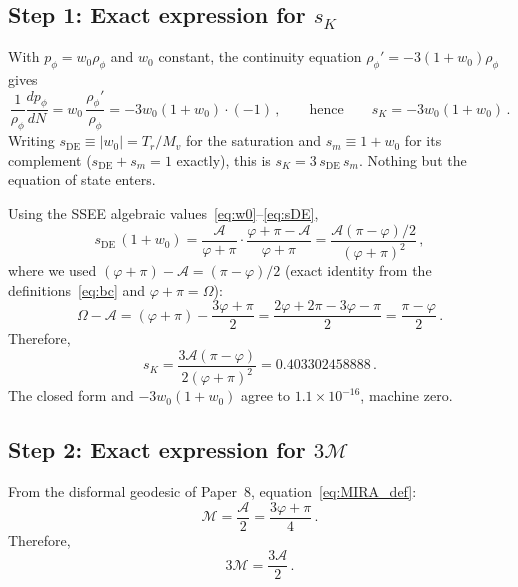 \documentclass[12pt,a4paper]{article}
\newcommand{\phiG}{\varphi}
\newcommand{\MIRA}{\mathcal{M}}
\newcommand{\AURA}{\mathcal{A}}
\newcommand{\sK}{s_K}          %
\newcommand{\sDE}{s_{\mathrm{DE}}} %
\renewcommand{\Omega}{\varOmega}
\begin{document}
\subsection{Step 1: Exact expression for $\sK$}
\label{sec:step1}

With $p_\phi = w_0\rho_\phi$ and $w_0$ constant, the continuity equation
$\rho_\phi' = -3(1+w_0)\rho_\phi$ gives
\begin{equation}
  \frac{1}{\rho_\phi}\frac{dp_\phi}{dN}
    = w_0\,\frac{\rho_\phi'}{\rho_\phi}
    = -3w_0(1+w_0)\cdot(-1)\,,
  \qquad\text{hence}\qquad
  \sK = -3w_0(1+w_0)\,.
  \label{eq:sK_exact}
\end{equation}
Writing $\sDE \equiv |w_0| = T_r/M_v$ for the saturation and
$s_m \equiv 1+w_0$ for its complement ($\sDE + s_m = 1$ exactly), this is
$\sK = 3\,\sDE\,s_m$.  Nothing but the equation of state enters.

Using the SSEE algebraic values~\eqref{eq:w0}--\eqref{eq:sDE},
\begin{equation}
  \sDE\,(1+w_0) = \frac{\AURA}{\phiG+\pi}\cdot\frac{\phiG+\pi-\AURA}{\phiG+\pi}
  = \frac{\AURA(\pi-\phiG)/2}{(\phiG+\pi)^2}\,,
  \label{eq:OmDE_1pw0}
\end{equation}
where we used $(\phiG+\pi)-\AURA = (\pi-\phiG)/2$ (exact identity from
the definitions~\eqref{eq:bc} and $\phiG+\pi = \Omega$):
\begin{equation}
  \Omega - \AURA = (\phiG+\pi) - \frac{3\phiG+\pi}{2}
  = \frac{2\phiG+2\pi-3\phiG-\pi}{2} = \frac{\pi-\phiG}{2}\,.
  \label{eq:Omega_minus_AURA}
\end{equation}
Therefore,
\begin{equation}
  \boxed{
    \sK = \frac{3\AURA(\pi-\phiG)}{2(\phiG+\pi)^2} = 0.403302458888\,.
  }
  \label{eq:alphaK_algebraic}
\end{equation}
The closed form and $-3w_0(1+w_0)$ agree to $1.1\times10^{-16}$, machine zero.

\subsection{Step 2: Exact expression for $3\MIRA$}
\label{sec:step2}

From the disformal geodesic of Paper~8, equation~\eqref{eq:MIRA_def}:
\begin{equation}
  \MIRA = \frac{\AURA}{2} = \frac{3\phiG+\pi}{4}\,.
  \label{eq:MIRA_exact}
\end{equation}
Therefore,
\begin{equation}
  3\MIRA = \frac{3\AURA}{2}\,.
  \label{eq:3MIRA}
\end{equation}
\end{document}

